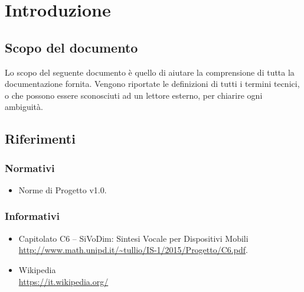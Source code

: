 \section{Introduzione}

\subsection{Scopo del documento}
Lo scopo del seguente documento è quello di aiutare la comprensione di tutta la 
documentazione fornita. Vengono riportate le definizioni di tutti i termini 
tecnici, o che possono essere sconosciuti ad un lettore esterno, per chiarire 
ogni ambiguità.

\subsection{Riferimenti}

\subsubsection{Normativi}
\begin{itemize}
\item Norme di Progetto v1.0.
\end{itemize}

\subsubsection{Informativi}
\begin{itemize}
\item Capitolato C6 – SiVoDim: Sintesi Vocale per Dispositivi Mobili\\ 
\url{http://www.math.unipd.it/~tullio/IS-1/2015/Progetto/C6.pdf}.
\item Wikipedia\\
\url{https://it.wikipedia.org/}
\end{itemize}


